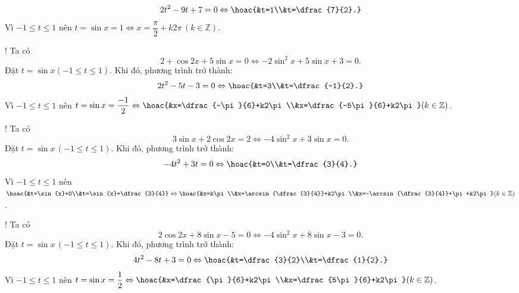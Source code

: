 \begin{bt}
{\begin{listEX}[2]
			$$
			2t^2-9t+7=0 \Leftrightarrow \hoac{&t=1\\&t=\dfrac{7}{2}.}
			$$
			Vì $-1\le t\le 1$ nên $t=\sin{x}=1\Leftrightarrow x=\dfrac{\pi}{2}+k2\pi\,(k\in\mathbb{Z})$.
			\item! Ta có
			$$
			2+\cos{2x}+5\sin{x}=0 \Leftrightarrow -2\sin^2{x}+5\sin{x}+3=0.
			$$
			Đặt $t=\sin{x}(-1\le t\le 1)$. Khi đó, phương trình trở thành:
			$$
			2t^2-5t-3=0 \Leftrightarrow \hoac{&t=3\\&t=\dfrac{-1}{2}.}
			$$
			Vì $-1\le t\le 1$ nên $t=\sin{x}=\dfrac{-1}{2}\Leftrightarrow\hoac{&x=\dfrac{-\pi}{6}+k2\pi\\&x=\dfrac{-5\pi}{6}+k2\pi}(k\in\mathbb{Z})$.
			\item! Ta có
			$$
			3\sin{x}+2\cos{2x}=2 \Leftrightarrow -4\sin^2{x}+3\sin{x}=0.
			$$
			Đặt $t=\sin{x}\,(-1\le t\le 1)$. Khi đó, phương trình trở thành:
			$$
			-4t^2+3t=0 \Leftrightarrow \hoac{&t=0\\&t=\dfrac{3}{4}.}
			$$
			Vì $-1\le t\le 1$ nên $\hoac{&t=\sin{x}=0\\&t=\sin{x}=\dfrac{3}{4}}\Leftrightarrow \hoac{&x=k\pi\\&x=\arcsin{\dfrac{3}{4}}+k2\pi\\&x=-\arcsin{\dfrac{3}{4}}+\pi+k2\pi}(k\in\mathbb{Z})$.
			\item! Ta có
			$$
			2\cos{2x}+8\sin{x}-5=0 \Leftrightarrow -4\sin^2{x}+8\sin{x}-3=0.
			$$
			Đặt $t=\sin{x}\,(-1\le t\le 1)$. Khi đó, phương trình trở thành:
			$$
			4t^2-8t+3=0 \Leftrightarrow \hoac{&t=\dfrac{3}{2}\\&t=\dfrac{1}{2}.}
			$$
			Vì $-1\le t\le 1$ nên $t=\sin{x}=\dfrac{1}{2}\Leftrightarrow\hoac{&x=\dfrac{\pi}{6}+k2\pi\\&x=\dfrac{5\pi}{6}+k2\pi}(k\in\mathbb{Z})$.
		\end{listEX}
	}
\end{bt}

